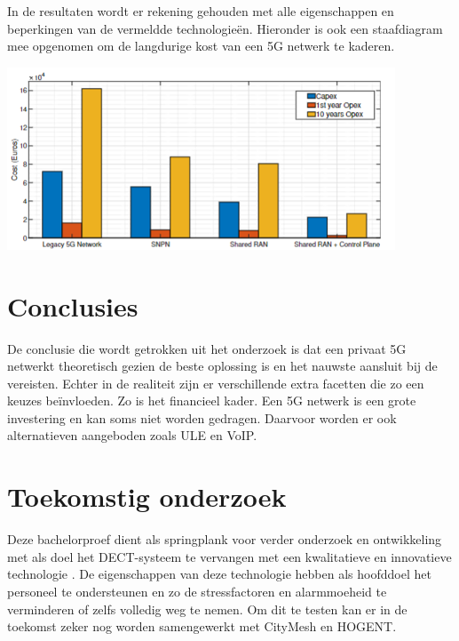 \documentclass[a0,portrait]{hogent-poster}
\begin{document}
\begin{multicols}{2}
In de resultaten wordt er rekening gehouden met alle eigenschappen en beperkingen van de vermeldde technologieën. Hieronder is ook een staafdiagram mee opgenomen om de langdurige kost van een 5G netwerk te kaderen. 
\begin{center}
  \captionsetup{type=figure}
  \includegraphics[width=1.0\linewidth]{./graphics/capex-opex.png}
\end{center}

\section{Conclusies}

De conclusie die wordt getrokken uit het onderzoek is dat een privaat 5G netwerkt theoretisch gezien de beste oplossing is en het nauwste aansluit bij de vereisten. Echter in de realiteit zijn er verschillende extra facetten die zo een keuzes beïnvloeden. Zo is het financieel kader. Een 5G netwerk is een grote investering en kan soms niet worden gedragen. Daarvoor worden er ook alternatieven aangeboden zoals ULE en VoIP.

\section{Toekomstig onderzoek}

Deze bachelorproef dient als springplank voor verder onderzoek en ontwikkeling met als doel het DECT-systeem te vervangen met een kwalitatieve en innovatieve technologie . De eigenschappen van deze technologie hebben als hoofddoel het personeel te ondersteunen en zo de stressfactoren en alarmmoeheid te verminderen of zelfs volledig weg te nemen.
Om dit te testen kan er in de toekomst zeker nog worden samengewerkt met CityMesh en HOGENT. 
\end{multicols}
\end{document}
